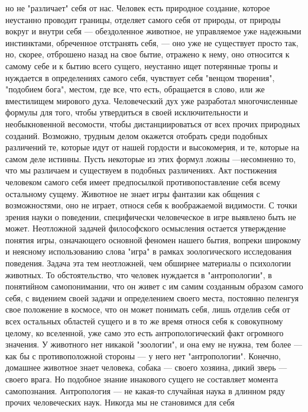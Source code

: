 \documentclass[12pt]{article}
\begin{document}
но не "различает" себя от нас. Человек есть природное создание, которое неустанно проводит границы, отделяет
самого себя от природы, от природы вокруг и внутри себя --- обездоленное животное, не управляемое уже
надежными  инстинктами,  обреченное  отстранять  себя,  ---  оно  уже  не  существует  просто  так,  но,  скорее,
отброшено назад на свое бытие, отражено к нему, оно относится к самому себе и к бытию всего сущего,
неустанно ищет потерянные тропы и нуждается в определениях самого себя, чувствует себя "венцом творения",
"подобием  бога",  местом,  где  все,  что  есть,  обращается  в  слово,  или  же  вместилищем  мирового  духа.
Человеческий  дух  уже  разработал  многочисленные  формулы  для  того,  чтобы  утвердиться  в  своей
исключительности  и  необыкновенной  весомости,  чтобы  дистанциироваться  от  всех  прочих  природных
созданий. Возможно, трудным делом окажется отобрать среди подобных различений те, которые идут от нашей
гордости и высокомерия, и те, которые на самом деле истинны. Пусть некоторые из этих формул ложны ---несомненно то, что мы различаем и существуем в подобных различениях. Акт постижения человеком самого
себя  имеет  предпосылкой  противопоставление  себя  всему  остальному  сущему.  Животное  не  знает  игры
фантазии как общения с возможностями, оно не играет, относя себя к воображаемой видимости. С точки зрения
науки  о  поведении,  специфически  человеческое  в  игре  выявлено  быть  не  может.  Неотложной  задачей
философского осмысления остается утверждение понятия игры, означающего основной феномен нашего бытия,
вопреки широкому и неясному использованию слова "игра" в рамках зоологического исследования поведения.
Задача эта тем неотложней, чем обширнее материалы о психологии животных. То обстоятельство, что человек
нуждается в "антропологии", в понятийном самопонимании, что он живет с им самим созданным образом
самого себя, с видением своей задачи и определением своего места, постоянно пеленгуя свое положение в
космосе, что он может понимать себя, лишь отделив себя от всех остальных областей сущего и в то же время
относя  себя  к  совокупному  целому,  ко  вселенной,  уже  само  это  есть  антропологический  факт  огромного
значения.
У животного нет никакой "зоологии", и она ему не нужна, тем более --- как бы с противоположной стороны --- у
него нет "антропологии". Конечно, домашнее животное знает человека, собака --- своего хозяина, дикий зверь ---своего врага. Но подобное знание инакового сущего не составляет момента самопознания. Антропология --- не
какая-то случайная наука в длинном ряду прочих человеческих наук. Никогда мы не становимся для себя
\end{document}

